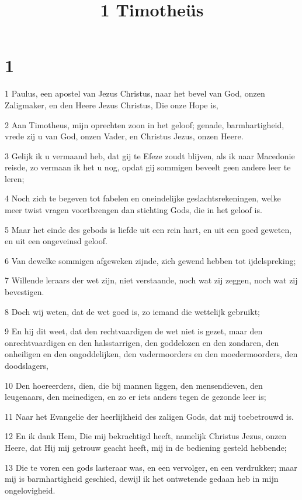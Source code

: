 

\title{1 Timotheüs}



\chapter{1}

\par 1 Paulus, een apostel van Jezus Christus, naar het bevel van God, onzen Zaligmaker, en den Heere Jezus Christus, Die onze Hope is,
\par 2 Aan Timotheus, mijn oprechten zoon in het geloof; genade, barmhartigheid, vrede zij u van God, onzen Vader, en Christus Jezus, onzen Heere.
\par 3 Gelijk ik u vermaand heb, dat gij te Efeze zoudt blijven, als ik naar Macedonie reisde, zo vermaan ik het u nog, opdat gij sommigen beveelt geen andere leer te leren;
\par 4 Noch zich te begeven tot fabelen en oneindelijke geslachtsrekeningen, welke meer twist vragen voortbrengen dan stichting Gods, die in het geloof is.
\par 5 Maar het einde des gebods is liefde uit een rein hart, en uit een goed geweten, en uit een ongeveinsd geloof.
\par 6 Van dewelke sommigen afgeweken zijnde, zich gewend hebben tot ijdelspreking;
\par 7 Willende leraars der wet zijn, niet verstaande, noch wat zij zeggen, noch wat zij bevestigen.
\par 8 Doch wij weten, dat de wet goed is, zo iemand die wettelijk gebruikt;
\par 9 En hij dit weet, dat den rechtvaardigen de wet niet is gezet, maar den onrechtvaardigen en den halsstarrigen, den goddelozen en den zondaren, den onheiligen en den ongoddelijken, den vadermoorders en den moedermoorders, den doodslagers,
\par 10 Den hoereerders, dien, die bij mannen liggen, den mensendieven, den leugenaars, den meinedigen, en zo er iets anders tegen de gezonde leer is;
\par 11 Naar het Evangelie der heerlijkheid des zaligen Gods, dat mij toebetrouwd is.
\par 12 En ik dank Hem, Die mij bekrachtigd heeft, namelijk Christus Jezus, onzen Heere, dat Hij mij getrouw geacht heeft, mij in de bediening gesteld hebbende;
\par 13 Die te voren een gods lasteraar was, en een vervolger, en een verdrukker; maar mij is barmhartigheid geschied, dewijl ik het ontwetende gedaan heb in mijn ongelovigheid.
